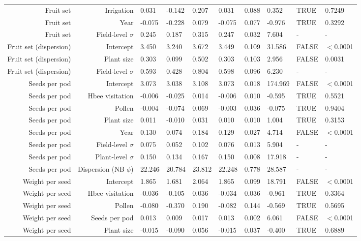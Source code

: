 \begin{landscape}
\begin{longtable}{|r|r|l|l|l|l|l|l|l|l|}
  Fruit set & Irrigation & 0.031 & -0.142 & 0.207 & 0.031 & 0.088 & 0.352 & TRUE & 0.7249 \\ 
  Fruit set & Year & -0.075 & -0.228 & 0.079 & -0.075 & 0.077 & -0.976 & TRUE & 0.3292 \\ 
  Fruit set & Field-level $\sigma$ & 0.245 & 0.187 & 0.315 & 0.247 & 0.032 & 7.604 & - & - \\ 
  Fruit set (dispersion) & Intercept & 3.450 & 3.240 & 3.672 & 3.449 & 0.109 & 31.586 & FALSE & $<$0.0001 \\ 
  Fruit set (dispersion) & Plant size & 0.303 & 0.099 & 0.502 & 0.303 & 0.103 & 2.956 & FALSE & 0.0031 \\ 
  Fruit set (dispersion) & Field-level $\sigma$ & 0.593 & 0.428 & 0.804 & 0.598 & 0.096 & 6.230 & - & - \\ 
  \hline %
  Seeds per pod & Intercept & 3.073 & 3.038 & 3.108 & 3.073 & 0.018 & 174.969 & FALSE & $<$0.0001 \\ 
  Seeds per pod & Hbee visitation & -0.006 & -0.025 & 0.014 & -0.006 & 0.010 & -0.595 & TRUE & 0.5521 \\ 
  Seeds per pod & Pollen & -0.004 & -0.074 & 0.069 & -0.003 & 0.036 & -0.075 & TRUE & 0.9404 \\ 
  Seeds per pod & Plant size & 0.011 & -0.010 & 0.031 & 0.010 & 0.010 & 1.004 & TRUE & 0.3153 \\ 
  Seeds per pod & Year & 0.130 & 0.074 & 0.184 & 0.129 & 0.027 & 4.714 & FALSE & $<$0.0001 \\ 
  Seeds per pod & Field-level $\sigma$ & 0.075 & 0.052 & 0.102 & 0.076 & 0.013 & 5.904 & - & - \\ 
  Seeds per pod & Plant-level $\sigma$ & 0.150 & 0.134 & 0.167 & 0.150 & 0.008 & 17.918 & - & - \\ 
  Seeds per pod & Dispersion (NB $\phi$) & 22.246 & 20.784 & 23.812 & 22.248 & 0.778 & 28.587 & - & - \\ 
  \hline %
  Weight per seed & Intercept & 1.865 & 1.681 & 2.064 & 1.865 & 0.099 & 18.791 & FALSE & $<$0.0001 \\ 
  Weight per seed & Hbee visitation & -0.036 & -0.105 & 0.036 & -0.034 & 0.036 & -0.961 & TRUE & 0.3364 \\ 
  Weight per seed & Pollen & -0.080 & -0.370 & 0.190 & -0.082 & 0.144 & -0.569 & TRUE & 0.5695 \\ 
  Weight per seed & Seeds per pod & 0.013 & 0.009 & 0.017 & 0.013 & 0.002 & 6.061 & FALSE & $<$0.0001 \\ 
  Weight per seed & Plant size & -0.015 & -0.090 & 0.056 & -0.015 & 0.037 & -0.400 & TRUE & 0.6889 \\ 

\end{longtable}
\end{landscape}
